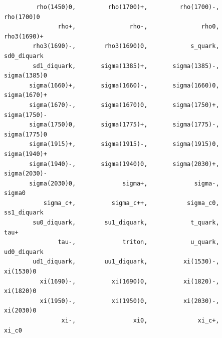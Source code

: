 \documentclass[a4paper,12pt]{article}
\begin{document}
\begin{verbatim}
         rho(1450)0,         rho(1700)+,         rho(1700)-,         rho(1700)0
               rho+,               rho-,               rho0,        rho3(1690)+
        rho3(1690)-,        rho3(1690)0,            s_quark,        sd0_diquark
        sd1_diquark,       sigma(1385)+,       sigma(1385)-,       sigma(1385)0
       sigma(1660)+,       sigma(1660)-,       sigma(1660)0,       sigma(1670)+
       sigma(1670)-,       sigma(1670)0,       sigma(1750)+,       sigma(1750)-
       sigma(1750)0,       sigma(1775)+,       sigma(1775)-,       sigma(1775)0
       sigma(1915)+,       sigma(1915)-,       sigma(1915)0,       sigma(1940)+
       sigma(1940)-,       sigma(1940)0,       sigma(2030)+,       sigma(2030)-
       sigma(2030)0,             sigma+,             sigma-,             sigma0
           sigma_c+,          sigma_c++,           sigma_c0,        ss1_diquark
        su0_diquark,        su1_diquark,            t_quark,               tau+
               tau-,             triton,            u_quark,        ud0_diquark
        ud1_diquark,        uu1_diquark,          xi(1530)-,          xi(1530)0
          xi(1690)-,          xi(1690)0,          xi(1820)-,          xi(1820)0
          xi(1950)-,          xi(1950)0,          xi(2030)-,          xi(2030)0
                xi-,                xi0,              xi_c+,              xi_c0
 \end{verbatim}
 \newpage
 
\end{document}
